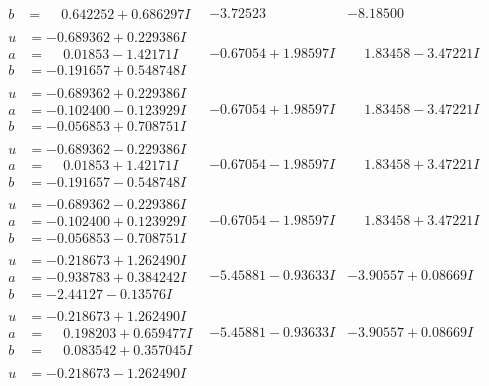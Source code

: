 \documentclass[1p]{elsarticle_modified}
\theoremstyle{definition}
\begin{document}
$$\begin{array}{c|c|c}
\begin{aligned}
b &= \phantom{-}0.642252 + 0.686297 I\end{aligned}
 & -3.72523\phantom{ +0.000000I} & -8.18500\phantom{ +0.000000I} \\ \hline\begin{aligned}
u &= -0.689362 + 0.229386 I \\
a &= \phantom{-}0.01853 - 1.42171 I \\
b &= -0.191657 + 0.548748 I\end{aligned}
 & -0.67054 + 1.98597 I & \phantom{-}1.83458 - 3.47221 I \\ \hline\begin{aligned}
u &= -0.689362 + 0.229386 I \\
a &= -0.102400 - 0.123929 I \\
b &= -0.056853 + 0.708751 I\end{aligned}
 & -0.67054 + 1.98597 I & \phantom{-}1.83458 - 3.47221 I \\ \hline\begin{aligned}
u &= -0.689362 - 0.229386 I \\
a &= \phantom{-}0.01853 + 1.42171 I \\
b &= -0.191657 - 0.548748 I\end{aligned}
 & -0.67054 - 1.98597 I & \phantom{-}1.83458 + 3.47221 I \\ \hline\begin{aligned}
u &= -0.689362 - 0.229386 I \\
a &= -0.102400 + 0.123929 I \\
b &= -0.056853 - 0.708751 I\end{aligned}
 & -0.67054 - 1.98597 I & \phantom{-}1.83458 + 3.47221 I \\ \hline\begin{aligned}
u &= -0.218673 + 1.262490 I \\
a &= -0.938783 + 0.384242 I \\
b &= -2.44127 - 0.13576 I\end{aligned}
 & -5.45881 - 0.93633 I & -3.90557 + 0.08669 I \\ \hline\begin{aligned}
u &= -0.218673 + 1.262490 I \\
a &= \phantom{-}0.198203 + 0.659477 I \\
b &= \phantom{-}0.083542 + 0.357045 I\end{aligned}
 & -5.45881 - 0.93633 I & -3.90557 + 0.08669 I \\ \hline\begin{aligned}
u &= -0.218673 - 1.262490 I \\

\end{aligned}
\end{array}$$
\end{document}
